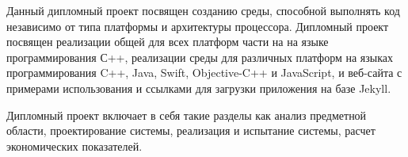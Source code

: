 Данный дипломный проект посвящен созданию среды, способной выполнять код независимо от типа платформы и архитектуры процессора.
Дипломный проект посвящен реализации общей для всех платформ части на на языке программирования С++, реализации среды для различных платформ
на языках программирования C++, Java, Swift, Objective-C++ и JavaScript, %
и веб-сайта с примерами использования и ссылками для загрузки приложения на базе Jekyll.

Дипломный проект включает в себя такие разделы как
анализ предметной области,
проектирование системы,
реализация и испытание системы,
расчет экономических показателей.
